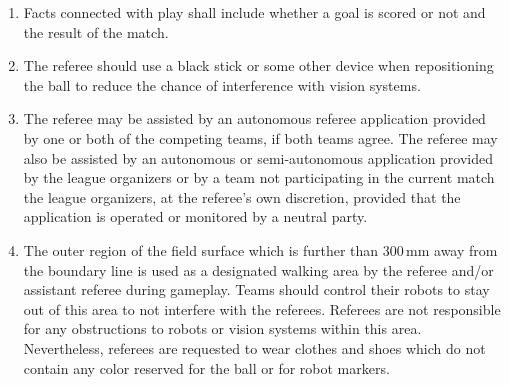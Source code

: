 \begin{enumerate}
\item
Facts connected with play shall include whether a goal is scored or not and the result of the match.

\item
The referee should use a black stick or some other device when repositioning the ball to reduce the chance of interference with vision systems.

\item
The referee may be assisted by an autonomous referee application provided by
one or both of the competing teams, if both teams agree. The referee may
also be assisted by an autonomous or semi-autonomous application provided
by the league organizers or by a team not participating in the current
match the league organizers, at the referee's own discretion, provided that the
application is operated or monitored by a neutral party.
\item
The outer region of the field surface which is further than 300\,mm away from
the boundary line is used as a designated walking area by the referee and/or
assistant referee during gameplay.
Teams should control their robots to stay out of this area to not interfere with the referees.
Referees are not responsible for any obstructions to robots or vision systems within this area.
Nevertheless, referees are requested to wear clothes and shoes which do not contain any color reserved for the ball or for robot markers.

\end{enumerate}
